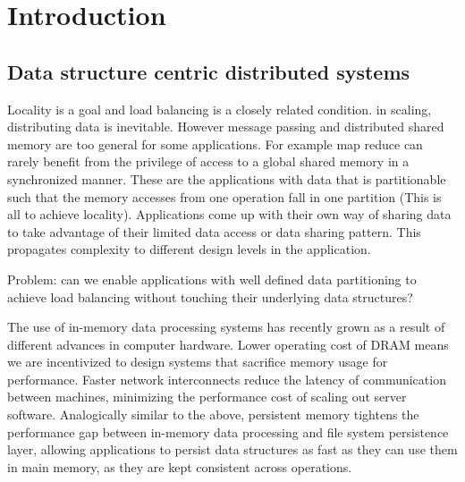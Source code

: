 \chapter{Introduction}
\label{chap:introduction}

\section{Data structure centric distributed systems}

Locality is a goal and load balancing is a closely related condition.
in scaling, distributing data is inevitable. However message passing and
distributed shared memory are too general for some applications. For example
map reduce can rarely benefit from the privilege of access to a global
shared memory in a synchronized manner. These are the applications with
data that is partitionable such that the memory accesses from one operation
fall in one partition
(This is all to achieve locality).
Applications come up with their own way of sharing data to take
advantage of their limited data access or data sharing pattern. This propagates
complexity to different design levels in the application.

Problem: can we enable applications with well defined data partitioning to
achieve load balancing without touching their underlying data structures?


The use of in-memory data processing systems has recently grown as a result of
different advances in computer hardware. Lower operating cost of DRAM means we
are incentivized to design systems that sacrifice memory usage for performance.
Faster network interconnects reduce the latency of communication between
machines, minimizing the performance cost of scaling out server software.
Analogically similar to the above, persistent memory tightens the performance
gap between in-memory data processing and file system persistence layer,
allowing applications to persist data structures as fast as they can use them
in main memory, as they are kept consistent across operations.

